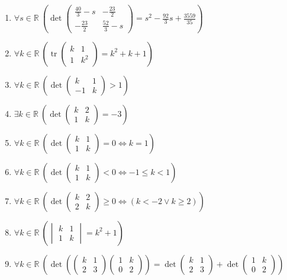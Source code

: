 \documentclass[11pt,a4paper]{article}
\begin{document}
\begin{enumerate}
\item $\displaystyle \forall s \in \mathbb{R}\ \left( \det \begin{pmatrix} \frac{40}{3} - s & -\frac{23}{2} \\ -\frac{23}{2} & \frac{52}{3} - s \end{pmatrix} = s^{2} - \frac{92}{3} s + \frac{3559}{35} \right)$
\item $\displaystyle \forall k \in \mathbb{R}\ \left( \operatorname{tr} \begin{pmatrix} k & 1 \\ 1 & k^{2} \end{pmatrix} = k^{2} + k + 1 \right)$
\item $\displaystyle \forall k \in \mathbb{R}\ \left( \det \begin{pmatrix} k & 1 \\ -1 & k \end{pmatrix} > 1 \right)$
\item $\displaystyle \exists k \in \mathbb{R}\ \left( \det \begin{pmatrix} k & 2 \\ 1 & k \end{pmatrix} = -3 \right)$
\item $\displaystyle \forall k \in \mathbb{R}\ \left( \det \begin{pmatrix} k & 1 \\ 1 & k \end{pmatrix} = 0 \iff k = 1 \right)$
\item $\displaystyle \forall k \in \mathbb{R}\ \left( \det \begin{pmatrix} k & 1 \\ 1 & k \end{pmatrix} < 0 \iff -1 \le k < 1 \right)$
\item $\displaystyle \forall k \in \mathbb{R}\ \left( \det \begin{pmatrix} k & 2 \\ 2 & k \end{pmatrix} \ge 0 \iff \left( k < -2 \lor k \ge 2 \right) \right)$
\item $\displaystyle \forall k \in \mathbb{R}\ \left( \begin{vmatrix} k & 1 \\ 1 & k \end{vmatrix} = k^{2} + 1 \right)$
\item $\displaystyle \forall k \in \mathbb{R}\ \left( \det\left( \begin{pmatrix} k & 1 \\ 2 & 3 \end{pmatrix} \begin{pmatrix} 1 & k \\ 0 & 2 \end{pmatrix} \right) = \det \begin{pmatrix} k & 1 \\ 2 & 3 \end{pmatrix} + \det \begin{pmatrix} 1 & k \\ 0 & 2 \end{pmatrix} \right)$

\end{enumerate}
\end{document}
